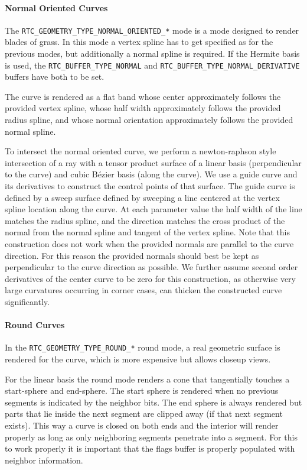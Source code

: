 \paragraph{Normal Oriented Curves}\label{normal-oriented-curves}

The \texttt{RTC\_GEOMETRY\_TYPE\_NORMAL\_ORIENTED\_*} mode is a mode
designed to render blades of grass. In this mode a vertex spline has to
get specified as for the previous modes, but additionally a normal
spline is required. If the Hermite basis is used, the
\texttt{RTC\_BUFFER\_TYPE\_NORMAL} and
\texttt{RTC\_BUFFER\_TYPE\_NORMAL\_DERIVATIVE} buffers have both to be
set.

The curve is rendered as a flat band whose center approximately follows
the provided vertex spline, whose half width approximately follows the
provided radius spline, and whose normal orientation approximately
follows the provided normal spline.

To intersect the normal oriented curve, we perform a newton-raphson
style intersection of a ray with a tensor product surface of a linear
basis (perpendicular to the curve) and cubic Bézier basis (along the
curve). We use a guide curve and its derivatives to construct the
control points of that surface. The guide curve is defined by a sweep
surface defined by sweeping a line centered at the vertex spline
location along the curve. At each parameter value the half width of the
line matches the radius spline, and the direction matches the cross
product of the normal from the normal spline and tangent of the vertex
spline. Note that this construction does not work when the provided
normals are parallel to the curve direction. For this reason the
provided normals should best be kept as perpendicular to the curve
direction as possible. We further assume second order derivatives of the
center curve to be zero for this construction, as otherwise very large
curvatures occurring in corner cases, can thicken the constructed curve
significantly.

\paragraph{Round Curves}\label{round-curves}

In the \texttt{RTC\_GEOMETRY\_TYPE\_ROUND\_*} round mode, a real
geometric surface is rendered for the curve, which is more expensive but
allows closeup views.

For the linear basis the round mode renders a cone that tangentially
touches a start-sphere and end-sphere. The start sphere is rendered when
no previous segments is indicated by the neighbor bits. The end sphere
is always rendered but parts that lie inside the next segment are
clipped away (if that next segment exists). This way a curve is closed
on both ends and the interior will render properly as long as only
neighboring segments penetrate into a segment. For this to work properly
it is important that the flags buffer is properly populated with
neighbor information.

